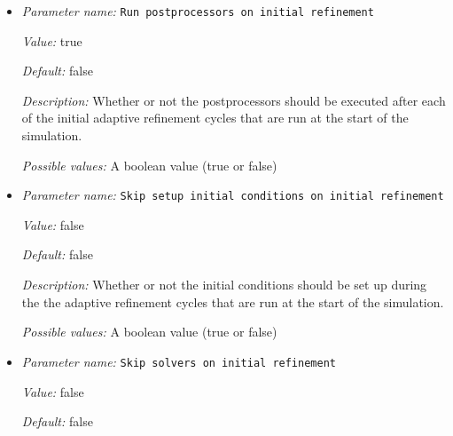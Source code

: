 \begin{itemize}
{\it Default:} 0.3


{\it Description:} The fraction of cells with the largest error that should be flagged for refinement.


{\it Possible values:} A floating point number $v$ such that $0 \leq v \leq 1$
\item {\it Parameter name:} {\tt Run postprocessors on initial refinement}
\label{parameters:Mesh refinement/Run postprocessors on initial refinement}
\label{parameters:Mesh_20refinement/Run_20postprocessors_20on_20initial_20refinement}


{\it Value:} true


{\it Default:} false


{\it Description:} Whether or not the postprocessors should be executed after each of the initial adaptive refinement cycles that are run at the start of the simulation.


{\it Possible values:} A boolean value (true or false)
\item {\it Parameter name:} {\tt Skip setup initial conditions on initial refinement}
\label{parameters:Mesh refinement/Skip setup initial conditions on initial refinement}
\label{parameters:Mesh_20refinement/Skip_20setup_20initial_20conditions_20on_20initial_20refinement}


{\it Value:} false


{\it Default:} false


{\it Description:} Whether or not the initial conditions should be set up during the the adaptive refinement cycles that are run at the start of the simulation.


{\it Possible values:} A boolean value (true or false)
\item {\it Parameter name:} {\tt Skip solvers on initial refinement}
\label{parameters:Mesh refinement/Skip solvers on initial refinement}
\label{parameters:Mesh_20refinement/Skip_20solvers_20on_20initial_20refinement}


{\it Value:} false


{\it Default:} false



\end{itemize}
